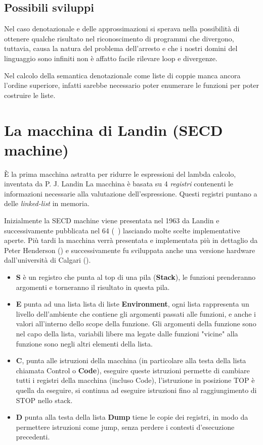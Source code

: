 \documentclass{article}
\begin{document}
\subsection{Possibili sviluppi}
Nel caso denotazionale e delle approssimazioni si sperava nella possibilità di ottenere qualche risultato nel riconoscimento di programmi che divergono, tuttavia, causa la natura del problema dell'arresto e che i nostri domini del linguaggio sono infiniti non è affatto facile rilevare loop e divergenze.

Nel calcolo della semantica denotazionale come liste di coppie manca ancora l'ordine superiore, infatti sarebbe necessario poter enumerare le funzioni per poter costruire le liste.


\appendix

\section{La macchina di Landin (SECD machine)}
\label{sec:landin}
È la prima macchina astratta per ridurre le espressioni del lambda calcolo, inventata da P. J. Landin La macchina è basata su 4 \emph{registri} contenenti le informazioni necessarie alla valutazione dell'espressione. Questi registri puntano a delle \emph{linked-list} in memoria.

Inizialmente la SECD machine viene presentata nel 1963 da Landin e successivamente pubblicata nel 64 (~\cite{LandinPJ}) lasciando molte scelte implementative aperte. Più tardi la macchina verrà presentata e implementata più in dettaglio da Peter Henderson (\cite{Henderson}) e successivamente fu sviluppata anche una versione hardware dall'università di Calgari (\cite{DesIsu}).

\begin{itemize}
	\item \textbf{S} è un registro che punta al top di una pila (\textbf{Stack}), le funzioni prenderanno argomenti e torneranno il risultato in questa pila.
	\item \textbf{E} punta ad una lista lista di liste \textbf{Environment}, ogni lista rappresenta un livello dell'ambiente che contiene gli argomenti passati alle funzioni, e anche i valori all'interno dello scope della funzione.
	Gli argomenti della funzione sono nel capo della lista, variabili libere ma legate dalle funzioni "vicine" alla funzione sono negli altri elementi della lista.
	\item \textbf{C}, punta alle istruzioni della macchina (in particolare alla testa della lista chiamata Control o \textbf{Code}), eseguire queste istruzioni permette di cambiare tutti i registri della macchina (incluso Code), l'istruzione in posizione TOP è quella da eseguire, si continua ad eseguire istruzioni fino al raggiungimento di STOP nello stack.
	\item \textbf{D} punta alla testa della lista \textbf{Dump} tiene le copie dei registri, in modo da permettere istruzioni come jump, senza perdere i contesti d'esecuzione precedenti.
\end{itemize}
\end{document}
